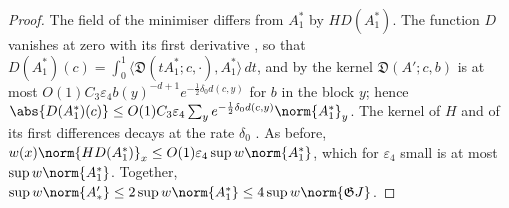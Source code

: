\begin{proof}
The field of the minimiser differs from $A_1^*$ by $HD(A_1^*)$. The function $D$ vanishes at zero with its first derivative \cite[(55), (56)]{BalabanVAR}, so that $D(A_1^*)(c) = \int_0^1\langle\mathfrak D(tA_1^*; c, \cdot), A_1^*\rangle\,dt$, and by \cite[(73), p.~289]{BalabanVAR} the kernel $\mathfrak D(A'; c, b)$ is at most $O(1)C_3\varepsilon_4b(y)^{-d+1}e^{-\frac{1}{2}\delta_0d(c,y)}$ for $b$ in the block $y$; hence $\abs{D(A_1^*)(c)} \leq O(1)C_3\varepsilon_4\sum_ye^{-\frac{1}{2}\delta_0d(c,y)}\norm{A_1^*}_y$. The kernel of $H$ and of its first differences decays at the rate $\delta_0$ \cite[(3.132), (3.133)]{BalabanPBG}. As before, $w(x)\norm{HD(A_1^*)}_x \leq O(1)\varepsilon_4\sup w\norm{A_1^*}$, which for $\varepsilon_4$ small is at most $\sup w\norm{A_1^*}$. Together, $\sup w\norm{A'_*} \leq 2\sup w\norm{A_1^*} \leq 4\sup w\norm{\mathfrak GJ}$.
\end{proof}



